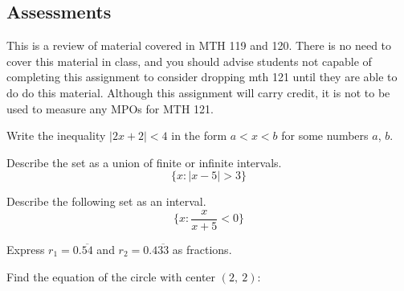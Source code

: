 \documentclass[12pt,addpoints, answers, fleqn]{exam}
\begin{document}
\begin{teacher}
\subsection{Assessments}
This is a review of material covered in MTH 119 and 120. There is no need to cover this material in class, and you should advise students not capable of completing this assignment to consider dropping mth 121 until they are able to do do this material. Although this assignment will carry credit, it is not to be used to measure any MPOs for MTH 121.
\begin{questions}
\question 	%
Write the inequality $\left|2x+2\right|<4$ in the form $a<x<b$ for some numbers  $a$, $b$.
\begin{solution}
\end{solution}

\question 	%
Describe the set as a union of finite or infinite intervals.
\[
\{ x: \left|x - 5\right| > 3\}
\]
\begin{solution}
\end{solution}

\question 	%
Describe the following set as an interval.
\[
\{ x :  \frac{x}{x+5} < 0 \}
\]
\begin{solution}
\end{solution}

\question 	%
Express $r_1 = 0.\overline {54}$ and $r_2 = 0.4\overline{33}$ as fractions.
\begin{solution}
\end{solution}

\question 	%
Find the equation of the circle with center $\left(2, \ 2\right)$:



\end{questions}
\end{teacher}
\end{document}
